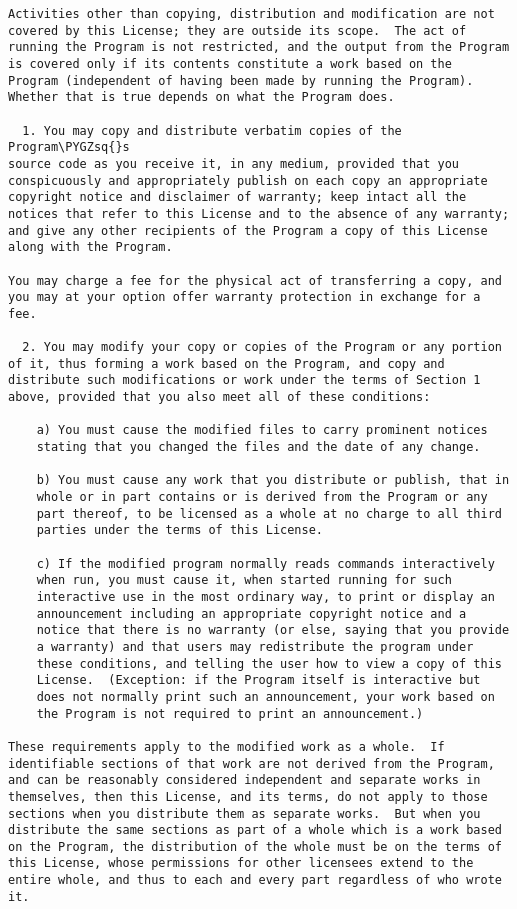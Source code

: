 \documentclass[letterpaper,10pt,english]{sphinxmanual}
\def\PYGZsq{\char`\'}
\begin{document}
\begin{Verbatim}[commandchars=\\\{\}]
Activities other than copying, distribution and modification are not
covered by this License; they are outside its scope.  The act of
running the Program is not restricted, and the output from the Program
is covered only if its contents constitute a work based on the
Program (independent of having been made by running the Program).
Whether that is true depends on what the Program does.

  1. You may copy and distribute verbatim copies of the Program\PYGZsq{}s
source code as you receive it, in any medium, provided that you
conspicuously and appropriately publish on each copy an appropriate
copyright notice and disclaimer of warranty; keep intact all the
notices that refer to this License and to the absence of any warranty;
and give any other recipients of the Program a copy of this License
along with the Program.

You may charge a fee for the physical act of transferring a copy, and
you may at your option offer warranty protection in exchange for a fee.

  2. You may modify your copy or copies of the Program or any portion
of it, thus forming a work based on the Program, and copy and
distribute such modifications or work under the terms of Section 1
above, provided that you also meet all of these conditions:

    a) You must cause the modified files to carry prominent notices
    stating that you changed the files and the date of any change.

    b) You must cause any work that you distribute or publish, that in
    whole or in part contains or is derived from the Program or any
    part thereof, to be licensed as a whole at no charge to all third
    parties under the terms of this License.

    c) If the modified program normally reads commands interactively
    when run, you must cause it, when started running for such
    interactive use in the most ordinary way, to print or display an
    announcement including an appropriate copyright notice and a
    notice that there is no warranty (or else, saying that you provide
    a warranty) and that users may redistribute the program under
    these conditions, and telling the user how to view a copy of this
    License.  (Exception: if the Program itself is interactive but
    does not normally print such an announcement, your work based on
    the Program is not required to print an announcement.)

These requirements apply to the modified work as a whole.  If
identifiable sections of that work are not derived from the Program,
and can be reasonably considered independent and separate works in
themselves, then this License, and its terms, do not apply to those
sections when you distribute them as separate works.  But when you
distribute the same sections as part of a whole which is a work based
on the Program, the distribution of the whole must be on the terms of
this License, whose permissions for other licensees extend to the
entire whole, and thus to each and every part regardless of who wrote it.


\end{Verbatim}
\end{document}
